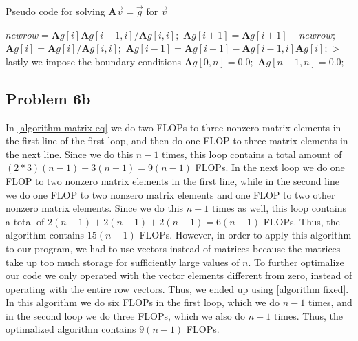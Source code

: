 \documentclass[english,notitlepage]{revtex4-1}  %
\begin{document}
\begin{algorithm}[H]
    \caption{Pseudo code for solving $\textbf{A}\vec{v} = \vec{g}$ for $\vec{v}$}\label{algorithm matrix eq}
    \begin{algorithmic}
         
        \State $newrow = \textbf{A}g[i]\textbf{A}g[i+1,i] / \textbf{A}g[i,i];$ 
        \State $\textbf{A}g[i+1] = \textbf{A}g[i+1] - newrow;$ 
        \EndFor
        \State
         
        \State $\textbf{A}g[i] = \textbf{A}g[i] / \textbf{A}g[i,i];$ 
        \State $\textbf{A}g[i-1] = \textbf{A}g[i-1] - \textbf{A}g[i-1,i]\textbf{A}g[i];$ 
        \EndFor
        \State
        \State $\triangleright$ lastly we impose the boundary conditions
        \State $\textbf{A}g[0,n] = 0.0;$  
        \State $\textbf{A}g[n-1,n] = 0.0;$  
    \end{algorithmic}
\end{algorithm}

\subsection*{Problem 6b}
In \cref{algorithm matrix eq} we do two FLOPs to three nonzero matrix elements in the first line of the first loop, and then do one FLOP to three matrix elements in the next line. Since we do this $n-1$ times, this loop contains a total amount of $(2*3)(n-1) + 3(n-1) = 9(n-1)$ FLOPs. In the next loop we do one FLOP to two nonzero matrix elements in the first line, while in the second line we do one FLOP to two nonzero matrix elements and one FLOP to two other nonzero matrix elements. Since we do this $n-1$ times as well, this loop contains a total of $2(n-1) + 2(n-1) + 2(n-1) = 6(n-1)$ FLOPs. Thus, the algorithm contains $15(n-1)$ FLOPs. However, in order to apply this algorithm to our program, we had to use vectors instead of matrices because the matrices take up too much storage for sufficiently large values of $n$. To further optimalize our code we only operated with the vector elements different from zero, instead of operating with the entire row vectors. Thus, we ended up using \cref{algorithm fixed}. In this algorithm we do six FLOPs in the first loop, which we do $n-1$ times, and in the second loop we do three FLOPs, which we also do $n-1$ times. Thus, the optimalized algorithm contains $9(n-1)$ FLOPs.
\end{document}
